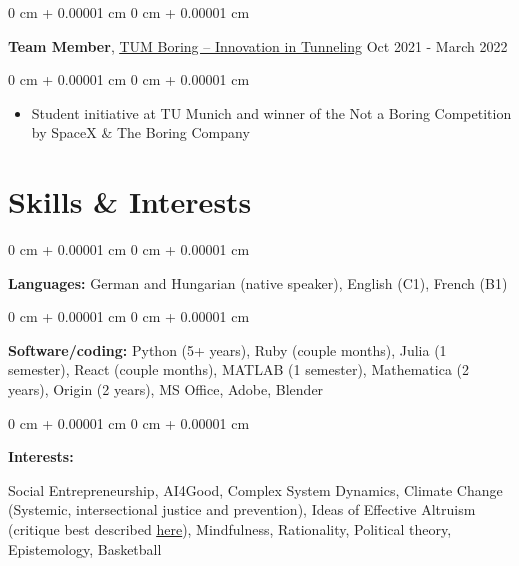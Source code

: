 \documentclass[10pt, letterpaper]{article}
\newenvironment{highlights}{
    \begin{itemize}[
        topsep=0.10 cm,
        parsep=0.10 cm,
        partopsep=0pt,
        itemsep=0pt,
        leftmargin=0 cm + 10pt
    ]
}{
    \end{itemize}
} %
\newenvironment{onecolentry}{
    \begin{adjustwidth}{
        0 cm + 0.00001 cm
    }{
        0 cm + 0.00001 cm
    }
}{
    \end{adjustwidth}
} %
\newenvironment{twocolentry}[2][]{
    \onecolentry
    \def\secondColumn{#2}
    \setcolumnwidth{\fill, 4.5 cm}
    \begin{paracol}{2}
}{
    \switchcolumn \raggedleft \secondColumn
    \end{paracol}
    \endonecolentry
} %
\begin{document}
        \vspace{0.2 cm}

        \begin{twocolentry}{
            Oct 2021 - March 2022
        }
            \textbf{Team Member}, \href{https://tum-boring.com/}{\underline{TUM Boring – Innovation in Tunneling}}\end{twocolentry}

        \vspace{0.10 cm}
        \begin{onecolentry}
            \begin{highlights}
                \item Student initiative at TU Munich and winner of the Not a Boring Competition by SpaceX \& The Boring Company
            \end{highlights}
        \end{onecolentry}

        \vspace{0.2 cm}

        


    \section{Skills \& Interests}

        \begin{onecolentry}
            \textbf{Languages:} German and Hungarian (native speaker), English (C1), French (B1)
        \end{onecolentry}

        \vspace{0.2 cm}

        \begin{onecolentry}
            \textbf{Software/coding:} Python (5+ years), Ruby (couple months), Julia (1 semester), React (couple months), MATLAB (1 semester),  Mathematica (2 years), Origin (2 years), MS Office, Adobe, Blender
        \end{onecolentry}

        \vspace{0.2 cm}

        \begin{onecolentry}
            \textbf{Interests:} 

            Social Entrepreneurship, AI4Good, Complex System Dynamics, Climate Change (Systemic, intersectional justice and prevention), Ideas of Effective Altruism (critique best described \href{https://www.youtube.com/watch?v=Lm0vHQYKI-Y}{\underline{here}}), Mindfulness, Rationality,  Political theory, Epistemology, Basketball
            
            
            
            
        \end{onecolentry}
\end{document}
